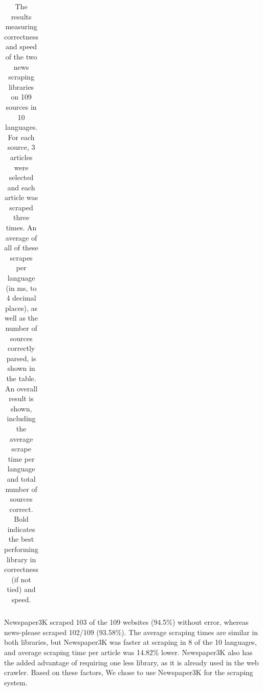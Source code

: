 \documentclass{l4proj}
\begin{document}
\begin{table}[]
\begin{tabular}{llllll}
\end{tabular}
\caption{The results measuring correctness and speed of the two news scraping libraries on 109 sources in 10 languages. For each source, 3 articles were selected and each article was scraped three times. An average of all of these scrapes per language (in ms, to 4 decimal places), as well as the number of sources correctly parsed, is shown in the table. An overall result is shown, including the average scrape time per language and total number of sources correct. Bold indicates the best performing library in correctness (if not tied) and speed.}
\label{table:scraper-library-results}
\end{table}

Newspaper3K scraped 103 of the 109 websites (94.5\%) without error, whereas news-please scraped 102/109 (93.58\%). The average scraping times are similar in both libraries, but Newspaper3K was faster at scraping in 8 of the 10 languages, and average scraping time per article was 14.82\% lower. Newspaper3K also has the added advantage of requiring one less library, as it is already used in the web crawler. Based on these factors, We chose to use Newspaper3K for the scraping system.
\end{document}
